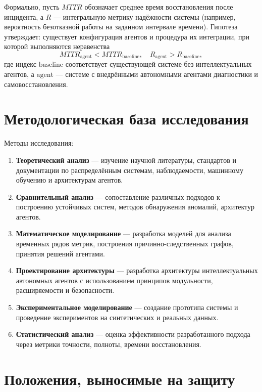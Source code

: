 Формально, пусть \(MTTR\) обозначает среднее время восстановления после инцидента, а \(R\) — интегральную метрику надёжности системы (например, вероятность безотказной работы на заданном интервале времени). Гипотеза утверждает: существует конфигурация агентов и процедура их интеграции, при которой выполняются неравенства
\begin{equation}
  MTTR_{\text{agent}} < MTTR_{\text{baseline}}, \quad
  R_{\text{agent}} > R_{\text{baseline}},
\label{eq:hypothesis_ineq}
\end{equation}
где индекс \(\text{baseline}\) соответствует существующей системе без интеллектуальных агентов, а \(\text{agent}\) — системе с внедрёнными автономными агентами диагностики и самовосстановления.

\section*{Методологическая база исследования}

Методы исследования:

\begin{enumerate}
    \item \textbf{Теоретический анализ} — изучение научной литературы, стандартов и документации по распределённым системам, наблюдаемости, машинному обучению и архитектурам агентов.
    \item \textbf{Сравнительный анализ} — сопоставление различных подходов к построению устойчивых систем, методов обнаружения аномалий, архитектур агентов.
    \item \textbf{Математическое моделирование} — разработка моделей для анализа временных рядов метрик, построения причинно-следственных графов, принятия решений агентами.
    \item \textbf{Проектирование архитектуры} — разработка архитектуры интеллектуальных автономных агентов с использованием принципов модульности, расширяемости и безопасности.
    \item \textbf{Экспериментальное моделирование} — создание прототипа системы и проведение экспериментов на синтетических и реальных данных.
    \item \textbf{Статистический анализ} — оценка эффективности разработанного подхода через метрики точности, полноты, времени восстановления.
\end{enumerate}

\section*{Положения, выносимые на защиту}

